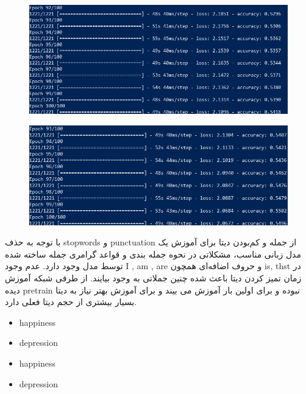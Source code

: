 \documentclass[10pt]{article}
\begin{document}
	
	\begin{figure}[ht!]
		\centering\includegraphics[width=0.9\linewidth]{../reports/lm_dep.png}
		\caption{ 
			}
		\label{lm_dep}
	\end{figure}

	\begin{figure}[ht!]
		\centering\includegraphics[width=0.9\linewidth]{../reports/lm_hap.png}
		\caption{
			}
		\label{lm_hap}
	\end{figure}

با توجه به حذف stopwords و punctuation از جمله و کم‌بودن دیتا برای آموزش یک مدل زبانی مناسب، مشکلاتی در نحوه جمله بندی و قواعد گرامری جمله ساخته شده توسط مدل وجود دارد. عدم وجود I , am , are و حروف اضافه‌ای همچون is, thst در زمان تمیز کردن دیتا باعث شده چنین جملاتی به وجود بیایند. از طرفی شبکه آموزش دیده pretrain نبوده و برای اولین بار آموزش می بیند و برای آموزش بهتر نیاز به دیتا بسیار بیشتری از حجم دیتا فعلی دارد.

\begin{itemize}
	\item happiness
	
	
	\item depression
	 
	
	\item happiness
	
	
	\item depression
	
\end{itemize}
\end{document}
